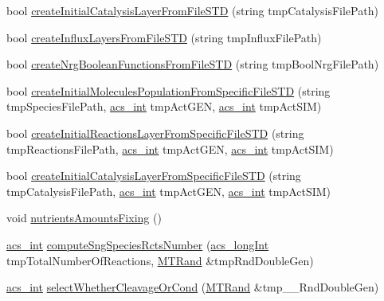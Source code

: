\begin{DoxyCompactItemize}
\item 
bool \hyperlink{classenvironment_a29eeb7a1b4689c10fd872e82179b4d84}{create\-Initial\-Catalysis\-Layer\-From\-File\-S\-T\-D} (string tmp\-Catalysis\-File\-Path)
\item 
bool \hyperlink{classenvironment_a902df40829dad9a885122082ec8fff7a}{create\-Influx\-Layers\-From\-File\-S\-T\-D} (string tmp\-Influx\-File\-Path)
\item 
bool \hyperlink{classenvironment_abe1a616460ea328067874df715679319}{create\-Nrg\-Boolean\-Functions\-From\-File\-S\-T\-D} (string tmp\-Bool\-Nrg\-File\-Path)
\item 
bool \hyperlink{classenvironment_aa70e1394bf2240f6e5f14d4cbf369a3b}{create\-Initial\-Molecules\-Population\-From\-Specific\-File\-S\-T\-D} (string tmp\-Species\-File\-Path, \hyperlink{acs__headers_8h_a8d277355641a098190360234e2ebde35}{acs\-\_\-int} tmp\-Act\-G\-E\-N, \hyperlink{acs__headers_8h_a8d277355641a098190360234e2ebde35}{acs\-\_\-int} tmp\-Act\-S\-I\-M)
\item 
bool \hyperlink{classenvironment_a743956229b11d7860dbc89a18f869586}{create\-Initial\-Reactions\-Layer\-From\-Specific\-File\-S\-T\-D} (string tmp\-Reactions\-File\-Path, \hyperlink{acs__headers_8h_a8d277355641a098190360234e2ebde35}{acs\-\_\-int} tmp\-Act\-G\-E\-N, \hyperlink{acs__headers_8h_a8d277355641a098190360234e2ebde35}{acs\-\_\-int} tmp\-Act\-S\-I\-M)
\item 
bool \hyperlink{classenvironment_a6dd31bae82367ebe7d6a6bb062b8cd07}{create\-Initial\-Catalysis\-Layer\-From\-Specific\-File\-S\-T\-D} (string tmp\-Catalysis\-File\-Path, \hyperlink{acs__headers_8h_a8d277355641a098190360234e2ebde35}{acs\-\_\-int} tmp\-Act\-G\-E\-N, \hyperlink{acs__headers_8h_a8d277355641a098190360234e2ebde35}{acs\-\_\-int} tmp\-Act\-S\-I\-M)
\item 
void \hyperlink{classenvironment_a9ceec5e00b0f5a51dd125c583b8ac5ec}{nutrients\-Amounts\-Fixing} ()
\item 
\hyperlink{acs__headers_8h_a8d277355641a098190360234e2ebde35}{acs\-\_\-int} \hyperlink{classenvironment_a0fd3cb062d35d2f6dd8961e95dd477b7}{compute\-Sng\-Species\-Rcts\-Number} (\hyperlink{acs__headers_8h_a19319d75f02db4308bc5c0026d98cd85}{acs\-\_\-long\-Int} tmp\-Total\-Number\-Of\-Reactions, \hyperlink{class_m_t_rand}{M\-T\-Rand} \&tmp\-Rnd\-Double\-Gen)
\item 
\hyperlink{acs__headers_8h_a8d277355641a098190360234e2ebde35}{acs\-\_\-int} \hyperlink{classenvironment_a53282cca8882e86652ab0a22e6966d17}{select\-Whether\-Cleavage\-Or\-Cond} (\hyperlink{class_m_t_rand}{M\-T\-Rand} \&tmp\-\_\-\-\_\-\-Rnd\-Double\-Gen)

\end{DoxyCompactItemize}
